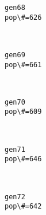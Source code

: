 \documentclass[11pt]{article}
\begin{document}
    \begin{Verbatim}[commandchars=\\\{\}]
gen68
pop\#=626

    \end{Verbatim}

    \begin{center}
    \end{center}
    { \hspace*{\fill} \\}
    
    \begin{Verbatim}[commandchars=\\\{\}]
gen69
pop\#=661

    \end{Verbatim}

    \begin{center}
    \end{center}
    { \hspace*{\fill} \\}
    
    \begin{Verbatim}[commandchars=\\\{\}]
gen70
pop\#=609

    \end{Verbatim}

    \begin{center}
    \end{center}
    { \hspace*{\fill} \\}
    
    \begin{Verbatim}[commandchars=\\\{\}]
gen71
pop\#=646

    \end{Verbatim}

    \begin{center}
    \end{center}
    { \hspace*{\fill} \\}
    
    \begin{Verbatim}[commandchars=\\\{\}]
gen72
pop\#=642

    \end{Verbatim}
\end{document}
